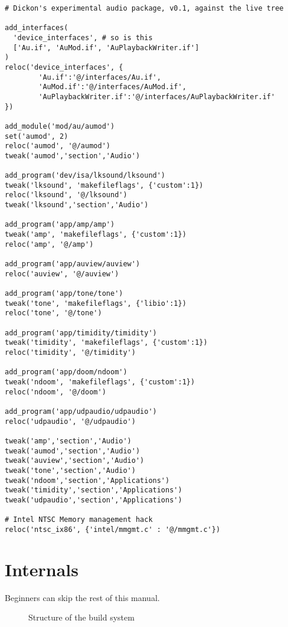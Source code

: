 \documentclass[a4paper]{article}
\begin{document}
\begin{small}
\begin{verbatim}
# Dickon's experimental audio package, v0.1, against the live tree

add_interfaces(
  'device_interfaces', # so is this
  ['Au.if', 'AuMod.if', 'AuPlaybackWriter.if']
)
reloc('device_interfaces', {
        'Au.if':'@/interfaces/Au.if',
        'AuMod.if':'@/interfaces/AuMod.if',
        'AuPlaybackWriter.if':'@/interfaces/AuPlaybackWriter.if'
})

add_module('mod/au/aumod')
set('aumod', 2)
reloc('aumod', '@/aumod')
tweak('aumod','section','Audio')

add_program('dev/isa/lksound/lksound')
tweak('lksound', 'makefileflags', {'custom':1})
reloc('lksound', '@/lksound')
tweak('lksound','section','Audio')

add_program('app/amp/amp')
tweak('amp', 'makefileflags', {'custom':1}) 
reloc('amp', '@/amp')

add_program('app/auview/auview')
reloc('auview', '@/auview')

add_program('app/tone/tone')
tweak('tone', 'makefileflags', {'libio':1})
reloc('tone', '@/tone')

add_program('app/timidity/timidity')
tweak('timidity', 'makefileflags', {'custom':1})
reloc('timidity', '@/timidity')

add_program('app/doom/ndoom')
tweak('ndoom', 'makefileflags', {'custom':1})
reloc('ndoom', '@/doom')

add_program('app/udpaudio/udpaudio')
reloc('udpaudio', '@/udpaudio')

tweak('amp','section','Audio')
tweak('aumod','section','Audio')
tweak('auview','section','Audio')
tweak('tone','section','Audio')
tweak('ndoom','section','Applications')
tweak('timidity','section','Applications')
tweak('udpaudio','section','Applications')

# Intel NTSC Memory management hack
reloc('ntsc_ix86', {'intel/mmgmt.c' : '@/mmgmt.c'})
\end{verbatim}
\end{small}

\section{Internals}

Beginners can skip the rest of this manual. 


\begin{figure}
\center{}
\caption{Structure of the build system}
\label{fig:nem}
\end{figure}
\end{document}
